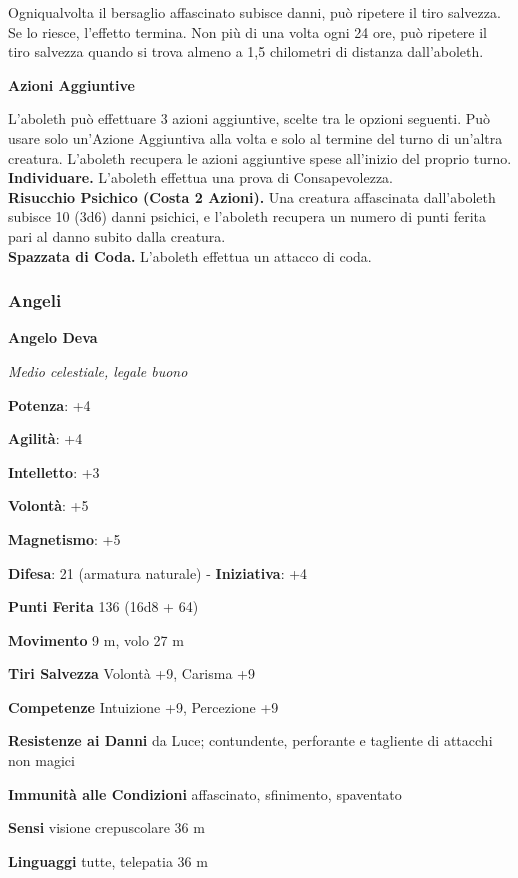 \begin{multicols}{2}
Ogniqualvolta il bersaglio affascinato subisce danni, può ripetere il
tiro salvezza. Se lo riesce, l'effetto termina. Non più di una volta
ogni 24 ore, può ripetere il tiro salvezza quando si trova almeno a 1,5
chilometri di distanza dall'aboleth.

\textbf{Azioni Aggiuntive}

L'aboleth può effettuare 3 azioni aggiuntive, scelte tra le opzioni seguenti. Può usare solo un'Azione Aggiuntiva alla volta e solo al termine del turno di un'altra creatura. L'aboleth recupera le azioni aggiuntive spese all'inizio del proprio turno.\\
\textbf{Individuare.} L'aboleth effettua una prova di Consapevolezza. \\
\textbf{Risucchio Psichico (Costa 2 Azioni).} Una creatura affascinata dall'aboleth subisce 10 (3d6) danni psichici, e l'aboleth recupera un numero di punti ferita pari al danno subito dalla creatura.\\
\textbf{Spazzata di Coda.} L'aboleth effettua un attacco di coda.

\subsubsection{Angeli}

\textbf{Angelo Deva}

\emph{Medio celestiale, legale buono}

\textbf{Potenza}: +4

\textbf{Agilità}: +4

\textbf{Intelletto}: +3

\textbf{Volontà}: +5

\textbf{Magnetismo}: +5

\textbf{Difesa}: 21 (armatura naturale) - \textbf{Iniziativa}: +4

\textbf{Punti Ferita} 136 (16d8 + 64)

\textbf{Movimento} 9 m, volo 27 m

\textbf{Tiri Salvezza} Volontà +9, Carisma +9 

\textbf{Competenze} Intuizione +9, Percezione +9

\textbf{Resistenze ai Danni} da Luce; contundente, perforante e
tagliente di attacchi non magici

\textbf{Immunità alle Condizioni} affascinato, sfinimento, spaventato

\textbf{Sensi} visione crepuscolare 36 m

\textbf{Linguaggi} tutte, telepatia 36 m


\end{multicols}
